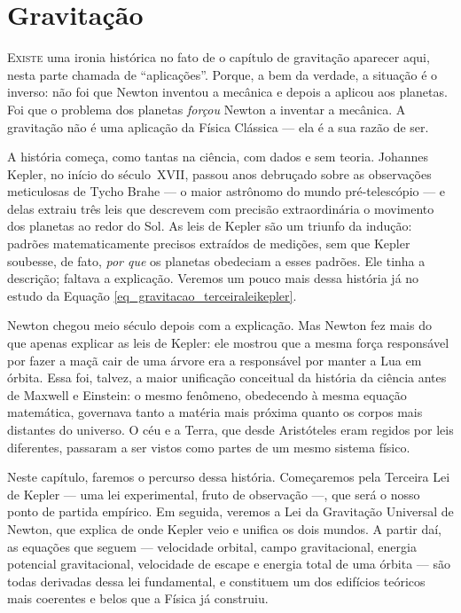 
\chapter{Gravitação}

\lettrine{E}{xiste} uma ironia histórica no fato de o capítulo de gravitação
aparecer aqui, nesta parte chamada de ``aplicações''. Porque, a bem
da verdade, a situação é o inverso: não foi que Newton inventou a
mecânica e depois a aplicou aos planetas. Foi que o problema dos
planetas \emph{forçou} Newton a inventar a mecânica. A gravitação
não é uma aplicação da Física Clássica --- ela é a sua razão de ser.
 
A história começa, como tantas na ciência, com dados e sem teoria.
Johannes Kepler, no início do século~XVII, passou anos debruçado
sobre as observações meticulosas de Tycho Brahe --- o maior
astrônomo do mundo pré-telescópio --- e delas extraiu três leis
que descrevem com precisão extraordinária o movimento dos planetas
ao redor do Sol. As leis de Kepler são um triunfo da indução:
padrões matematicamente precisos extraídos de medições, sem que
Kepler soubesse, de fato, \emph{por que} os planetas obedeciam
a esses padrões. Ele tinha a descrição; faltava a explicação. Veremos um pouco mais dessa história já no estudo da Equação \eqref{eq_gravitacao_terceiraleikepler}.
 
Newton chegou meio século depois com a explicação. Mas Newton fez
mais do que apenas explicar as leis de Kepler: ele mostrou que a
mesma força responsável por fazer a maçã cair de uma árvore era a
responsável por manter a Lua em órbita. Essa foi, talvez, a maior
unificação conceitual da história da ciência antes de Maxwell e
Einstein: o mesmo fenômeno, obedecendo à mesma equação matemática,
governava tanto a matéria mais próxima quanto os corpos mais
distantes do universo. O céu e a Terra, que desde Aristóteles eram
regidos por leis diferentes, passaram a ser vistos como partes de
um mesmo sistema físico.
 
Neste capítulo, faremos o percurso dessa história. Começaremos
pela Terceira Lei de Kepler --- uma lei experimental, fruto de
observação ---,  que será o nosso ponto de partida empírico. Em
seguida, veremos a Lei da Gravitação Universal de Newton, que
explica de onde Kepler veio e unifica os dois mundos. A partir
daí, as equações que seguem --- velocidade orbital, campo
gravitacional, energia potencial gravitacional, velocidade de
escape e energia total de uma órbita --- são todas derivadas dessa
lei fundamental, e constituem um dos edifícios teóricos mais
coerentes e belos que a Física já construiu.
 
